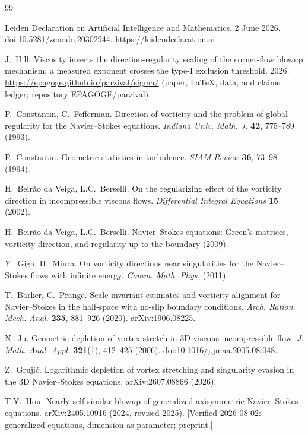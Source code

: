 \documentclass[11pt]{article}
\begin{document}
\begin{thebibliography}{99}

 Leiden Declaration on Artificial Intelligence
and Mathematics. 2 June 2026. doi:10.5281/zenodo.20302944.
\url{https://leidendeclaration.ai}


 J.~Hill.
Viscosity inverts the direction-regularity scaling of the corner-flow
blowup mechanism: a measured exponent crosses the type-I exclusion
threshold. 2026.
\url{https://epagoge.github.io/parzival/sigma/}
(paper, LaTeX, data, and claims ledger; repository EPAGOGE/parzival).

 P.~Constantin, C.~Fefferman.
Direction of vorticity and the problem of global regularity for the
Navier--Stokes equations.
\emph{Indiana Univ. Math. J.} \textbf{42}, 775--789 (1993).

 P.~Constantin.
Geometric statistics in turbulence.
\emph{SIAM Review} \textbf{36}, 73--98 (1994).

 H.~Beir\~ao da Veiga, L.C.~Berselli.
On the regularizing effect of the vorticity direction in
incompressible viscous flows.
\emph{Differential Integral Equations} \textbf{15} (2002).

 H.~Beir\~ao da Veiga, L.C.~Berselli.
Navier--Stokes equations: Green's matrices, vorticity direction, and
regularity up to the boundary (2009).

 Y.~Giga, H.~Miura.
On vorticity directions near singularities for the Navier--Stokes
flows with infinite energy.
\emph{Comm. Math. Phys.} (2011).

 T.~Barker, C.~Prange.
Scale-invariant estimates and vorticity alignment for Navier--Stokes
in the half-space with no-slip boundary conditions.
\emph{Arch. Ration. Mech. Anal.} \textbf{235}, 881--926 (2020).
arXiv:1906.08225.

 N.~Ju.
Geometric depletion of vortex stretch in 3D viscous incompressible
flow.
\emph{J. Math. Anal. Appl.} \textbf{321}(1), 412--425 (2006).
doi:10.1016/j.jmaa.2005.08.048.

 Z.~Gruji\'c.
Logarithmic depletion of vortex stretching and singularity evasion in
the 3D Navier--Stokes equations.
arXiv:2607.08866 (2026).

 T.Y.~Hou.
Nearly self-similar blowup of generalized axisymmetric Navier--Stokes
equations.
arXiv:2405.10916 (2024, revised 2025).
[Verified 2026-08-02: generalized equations, dimension as parameter;
preprint.]

\end{thebibliography}
\end{document}
